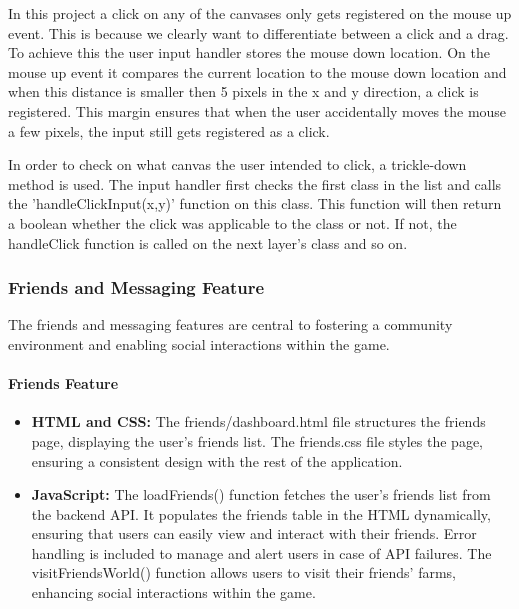 \documentclass[12pt]{article}
\begin{document}
In this project a click on any of the canvases only gets registered on the mouse up event. This is because we clearly
want to differentiate between a click and a drag. To achieve this the user input handler stores the mouse down location.
On the mouse up event it compares the current location to the mouse down location and when this distance is smaller then
5 pixels in the x and y direction, a click is registered. This margin ensures that when the user accidentally moves the
mouse a few pixels, the input still gets registered as a click.

In order to check on what canvas the user intended to click, a trickle-down method is used. The input handler first
checks the first class in the list and calls the 'handleClickInput(x,y)' function on this class. This function will then
return a boolean whether the click was applicable to the class or not. If not, the handleClick function is called on the
next layer's class and so on.


\subsubsection{Friends and Messaging Feature}
The friends and messaging features are central to fostering a community environment and enabling social interactions within the game.
\paragraph{Friends Feature}
\begin{itemize}
    \item \textbf{HTML and CSS:} The friends/dashboard.html file structures the friends page, displaying the user's friends list. The friends.css file styles the page, ensuring a consistent design with the rest of the application.
    \item \textbf{JavaScript:} The loadFriends() function fetches the user's friends list from the backend API. It populates the friends table in the HTML dynamically, ensuring that users can easily view and interact with their friends. Error handling is included to manage and alert users in case of API failures. The visitFriendsWorld() function allows users to visit their friends' farms, enhancing social interactions within the game.
\end{itemize}
\end{document}
